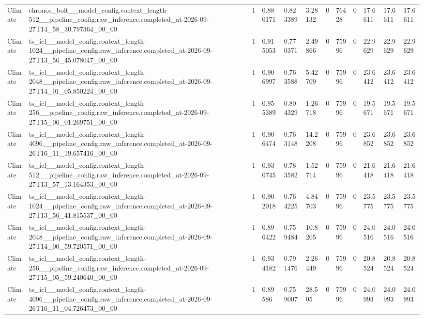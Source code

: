 \begin{tabular}{llllllllllll}
Climate & chronos\_bolt\_\_model\_config.context\_length-512\_\_pipeline\_config.raw\_inference.completed\_at-2026-09-27T14\_58\_30.797364\_00\_00 & 1 & 0.880171 & 0.823389 & 3.28132 & 0 & 76428 & 0 & 17.6611 & 17.6611 & 17.6611 \\
Climate & ts\_icl\_\_model\_config.context\_length-1024\_\_pipeline\_config.raw\_inference.completed\_at-2026-09-27T13\_56\_45.078047\_00\_00 & 1 & 0.915053 & 0.770371 & 2.49866 & 0 & 75996 & 0 & 22.9629 & 22.9629 & 22.9629 \\
Climate & ts\_icl\_\_model\_config.context\_length-2048\_\_pipeline\_config.raw\_inference.completed\_at-2026-09-27T14\_01\_05.850224\_00\_00 & 1 & 0.906997 & 0.763588 & 5.42709 & 0 & 75996 & 0 & 23.6412 & 23.6412 & 23.6412 \\
Climate & ts\_icl\_\_model\_config.context\_length-256\_\_pipeline\_config.raw\_inference.completed\_at-2026-09-27T15\_06\_01.269751\_00\_00 & 1 & 0.955389 & 0.804329 & 1.26718 & 0 & 75996 & 0 & 19.5671 & 19.5671 & 19.5671 \\
Climate & ts\_icl\_\_model\_config.context\_length-4096\_\_pipeline\_config.raw\_inference.completed\_at-2026-09-26T16\_11\_19.657416\_00\_00 & 1 & 0.906474 & 0.763148 & 14.2208 & 0 & 75996 & 0 & 23.6852 & 23.6852 & 23.6852 \\
Climate & ts\_icl\_\_model\_config.context\_length-512\_\_pipeline\_config.raw\_inference.completed\_at-2026-09-27T13\_57\_13.164353\_00\_00 & 1 & 0.930745 & 0.783582 & 1.52714 & 0 & 75996 & 0 & 21.6418 & 21.6418 & 21.6418 \\
Climate & ts\_icl\_\_model\_config.context\_length-1024\_\_pipeline\_config.raw\_inference.completed\_at-2026-09-27T13\_56\_41.815537\_00\_00 & 1 & 0.902018 & 0.764225 & 4.84703 & 0 & 75996 & 0 & 23.5775 & 23.5775 & 23.5775 \\
Climate & ts\_icl\_\_model\_config.context\_length-2048\_\_pipeline\_config.raw\_inference.completed\_at-2026-09-27T14\_00\_59.720571\_00\_00 & 1 & 0.896422 & 0.759484 & 10.8205 & 0 & 75996 & 0 & 24.0516 & 24.0516 & 24.0516 \\
Climate & ts\_icl\_\_model\_config.context\_length-256\_\_pipeline\_config.raw\_inference.completed\_at-2026-09-27T15\_05\_59.240640\_00\_00 & 1 & 0.934182 & 0.791476 & 2.26449 & 0 & 75996 & 0 & 20.8524 & 20.8524 & 20.8524 \\
Climate & ts\_icl\_\_model\_config.context\_length-4096\_\_pipeline\_config.raw\_inference.completed\_at-2026-09-26T16\_11\_04.726473\_00\_00 & 1 & 0.89586 & 0.759007 & 28.505 & 0 & 75996 & 0 & 24.0993 & 24.0993 & 24.0993 \\

\end{tabular}
